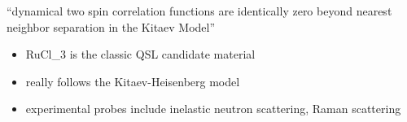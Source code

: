 ``dynamical two spin correlation functions are identically zero beyond nearest neighbor separation in the Kitaev Model''~\autocite{baskaranExactResultsSpin2007}

\begin{itemize}
\tightlist
\item
  RuCl\_3 is the classic QSL candidate material
\item
  really follows the Kitaev-Heisenberg model
\item
  experimental probes include inelastic neutron scattering, Raman scattering
\end{itemize}
